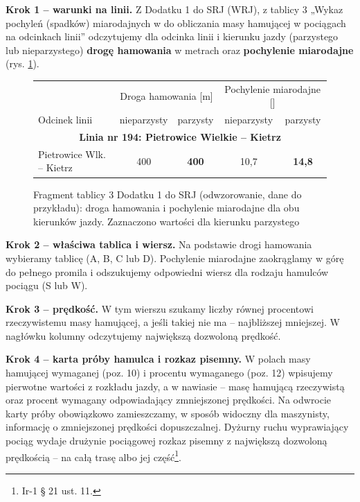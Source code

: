 \textbf{Krok 1 – warunki na linii.} Z Dodatku 1 do SRJ (WRJ), z tablicy 3 „Wykaz pochyleń (spadków) miarodajnych w \textperthousand{} do obliczania masy hamującej w pociągach na odcinkach linii” odczytujemy dla odcinka linii i kierunku jazdy (parzystego lub nieparzystego) \textbf{drogę hamowania} w metrach oraz \textbf{pochylenie miarodajne} (rys. \ref{fig:tablica3}).
\begin{figure}
	\centering
	\setlength{\tabcolsep}{5pt}
	\footnotesize
	\begin{tabular}{l|cc|cc}
		\hline
		 & \multicolumn{2}{c|}{Droga hamowania [m]} & \multicolumn{2}{c}{Pochylenie miarodajne [\textperthousand]} \\
		Odcinek linii & nieparzysty & parzysty & nieparzysty & parzysty \\
		\hline
		\multicolumn{5}{c}{\textbf{Linia nr 194: Pietrowice Wielkie – Kietrz}} \\
		\hline
		Pietrowice Wlk. – Kietrz & 400 & \cellcolor{green!15}\textbf{400} & 10,7 & \cellcolor{green!15}\textbf{14,8} \\
		\hline
	\end{tabular}
	\caption{Fragment tablicy 3 Dodatku 1 do SRJ (odwzorowanie, dane do przykładu): droga hamowania i pochylenie miarodajne dla obu kierunków jazdy. Zaznaczono wartości dla kierunku parzystego}
	\label{fig:tablica3}
\end{figure}

\textbf{Krok 2 – właściwa tablica i wiersz.} Na podstawie drogi hamowania wybieramy tablicę (A, B, C lub D). Pochylenie miarodajne zaokrąglamy w górę do pełnego promila i odszukujemy odpowiedni wiersz dla rodzaju hamulców pociągu (S lub W).

\textbf{Krok 3 – prędkość.} W tym wierszu szukamy liczby równej procentowi rzeczywistemu masy hamującej, a jeśli takiej nie ma – najbliższej mniejszej. W nagłówku kolumny odczytujemy największą dozwoloną prędkość.

\textbf{Krok 4 – karta próby hamulca i rozkaz pisemny.} W polach masy hamującej wymaganej (poz. 10) i procentu wymaganego (poz. 12) wpisujemy pierwotne wartości z rozkładu jazdy, a w nawiasie – masę hamującą rzeczywistą oraz procent wymagany odpowiadający zmniejszonej prędkości. Na odwrocie karty próby obowiązkowo zamieszczamy, w sposób widoczny dla maszynisty, informację o zmniejszonej prędkości dopuszczalnej. Dyżurny ruchu wyprawiający pociąg wydaje drużynie pociągowej rozkaz pisemny z największą dozwoloną prędkością – na całą trasę albo jej część\footnote{Ir-1 § 21 ust. 11.}.

